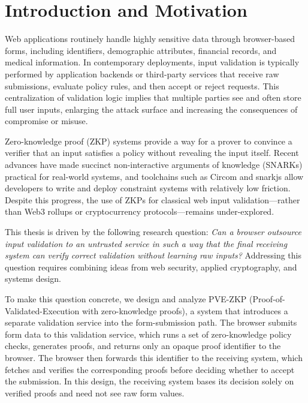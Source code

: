 
\chapter{Introduction and Motivation}

Web applications routinely handle highly sensitive data through browser-based
forms, including identifiers, demographic attributes, financial records, and
medical information. In contemporary deployments, input validation is typically
performed by application backends or third-party services that receive raw
submissions, evaluate policy rules, and then accept or reject requests. This
centralization of validation logic implies that multiple parties see and often
store full user inputs, enlarging the attack surface and increasing the
consequences of compromise or misuse.

Zero-knowledge proof (ZKP) systems provide a way for a prover to convince a
verifier that an input satisfies a policy without revealing the input itself.
Recent advances have made succinct non-interactive arguments of knowledge
(SNARKs) practical for real-world systems, and toolchains such as Circom and
snarkjs allow developers to write and deploy constraint systems with relatively
low friction. Despite this progress, the use of ZKPs for classical web input
validation---rather than Web3 rollups or cryptocurrency protocols---remains
under-explored.

This thesis is driven by the following research question: \emph{Can a browser
outsource input validation to an untrusted service in such a way that the final
receiving system can verify correct validation without learning raw inputs?}
Addressing this question requires combining ideas from web security, applied
cryptography, and systems design.

To make this question concrete, we design and analyze PVE-ZKP (Proof-of-
Validated-Execution with zero-knowledge proofs), a system that introduces a
separate validation service into the form-submission path. The browser submits
form data to this validation service, which runs a set of zero-knowledge policy
checks, generates proofs, and returns only an opaque proof identifier to the
browser. The browser then forwards this identifier to the receiving system,
which fetches and verifies the corresponding proofs before deciding whether to
accept the submission. In this design, the receiving system bases its decision
solely on verified proofs and need not see raw form values.

